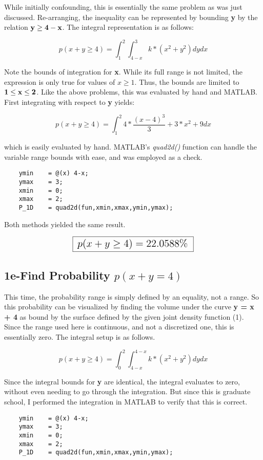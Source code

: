 \documentclass[]{article}
\begin{document}
While initially confounding, this is essentially the same problem as was just discussed. Re-arranging, the inequality can be represented by bounding {\bf y} by the relation ${\bf y \ge 4 - x }$. The integral representation is as follows:

\begin{displaymath}
	p(x+y \ge 4 )  = \int_1^2{\int_{4-x}^3 {k*(x^2+y^2)   dy} dx }
\end{displaymath}  

\noindent Note the bounds of integration for {\bf x}. While its full range is not limited, the expression is only true for values of $x \ge 1$. Thus, the bounds are limited to ${\bf 1 \le x \le 2}$. Like the above problems, this was evaluated by hand and MATLAB. First integrating with respect to {\bf y} yields:


\begin{displaymath}
	p(x+y \ge 4 )  = \int_1^2{4*\frac{(x - 4)^3}{3} + 3*x^2 + 9} dx 
\end{displaymath}  

\noindent which is easily evaluated by hand. MATLAB's \emph{quad2d()} function can handle the variable range bounds with ease, and was employed as a check. 

\begin{lstlisting}
	ymin    = @(x) 4-x;
	ymax    = 3;
	xmin    = 0; 
	xmax    = 2;
	P_1D    = quad2d(fun,xmin,xmax,ymin,ymax);
\end{lstlisting}

\noindent Both methods yielded the same result. 

\begin{displaymath}
	\fbox {   \Large $p(x+y \ge 4 )  = 22.0588\%$  }
\end{displaymath}  



\subsection*{1e-Find Probability $ p(x+y = 4 )   $}

This time, the probability range is simply defined by an equality, not a range. So this probability can be visualized by finding the volume under the curve {\bf y = x + 4} as bound by the surface defined by the given joint density function (1). Since the range used here is continuous, and not a discretized one, this is essentially zero. The integral setup is as follows.

\begin{displaymath}
	p(x+y \ge 4 )  = \int_0^2{\int_{4-x}^{4-x}{k*(x^2+y^2)   dy} dx}
\end{displaymath}   

\noindent Since the integral bounds for {\bf y} are identical, the integral evaluates to zero, without even needing to go through the integration. But since this is graduate school, I performed the integration in MATLAB to verify that this is correct. 

\begin{lstlisting}
	ymin    = @(x) 4-x;
	ymax    = 3;
	xmin    = 0; 
	xmax    = 2;
	P_1D    = quad2d(fun,xmin,xmax,ymin,ymax);
\end{lstlisting}
\end{document}
